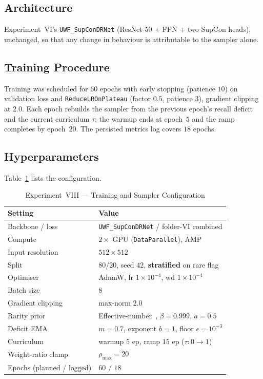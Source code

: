 \documentclass[journal,twoside,web]{ieeecolor}
\begin{document}
\subsection{Architecture}
Experiment~VI's \texttt{UWF\_SupConDRNet} (ResNet-50 + FPN + two SupCon heads),
unchanged, so that any change in behaviour is attributable to the sampler alone.

\subsection{Training Procedure}
Training was scheduled for $60$ epochs with early stopping (patience $10$) on
validation loss and \texttt{ReduceLROnPlateau} (factor $0.5$, patience $3$),
gradient clipping at $2.0$. Each epoch rebuilds the sampler from the previous
epoch's recall deficit and the current curriculum $\tau$; the warmup ends at
epoch~$5$ and the ramp completes by epoch~$20$. The persisted metrics log covers
$18$ epochs.

\subsection{Hyperparameters}
Table~\ref{tab:exp8_hyper} lists the configuration.

\begin{table}[!t]
\caption{Experiment~VIII --- Training and Sampler Configuration}
\label{tab:exp8_hyper}
\centering
\setlength{\tabcolsep}{5pt}
\begin{tabular}{|l|l|}
\hline
\textbf{Setting} & \textbf{Value} \\
\hline
Backbone / loss & \texttt{UWF\_SupConDRNet} / folder-VI combined \\
Compute & $2\times$ GPU (\texttt{DataParallel}), AMP \\
Input resolution & $512\times512$ \\
Split & 80/20, seed $42$, \textbf{stratified} on rare flag \\
Optimiser & AdamW, lr $1\times10^{-4}$, wd $1\times10^{-4}$ \\
Batch size & $8$ \\
Gradient clipping & max-norm $2.0$ \\
Rarity prior & Effective-number~\cite{effnum}, $\beta{=}0.999$, $a{=}0.5$ \\
Deficit EMA & $m{=}0.7$, exponent $b{=}1$, floor $\epsilon{=}10^{-3}$ \\
Curriculum & warmup $5$ ep, ramp $15$ ep ($\tau{:}0{\to}1$) \\
Weight-ratio clamp & $\rho_{\max}=20$ \\
Epochs (planned / logged) & $60$ / $18$ \\
\hline
\end{tabular}
\end{table}
\end{document}
